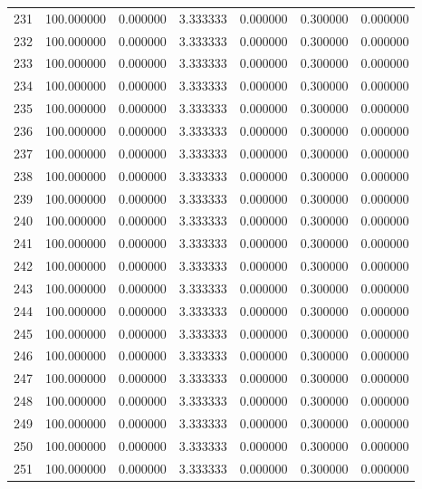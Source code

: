 \begin{tabular}{rrrrrrr}
231 & 100.000000 &    0.000000 &  3.333333 &    0.000000 &    0.300000 &  0.000000 \\
232 & 100.000000 &    0.000000 &  3.333333 &    0.000000 &    0.300000 &  0.000000 \\
233 & 100.000000 &    0.000000 &  3.333333 &    0.000000 &    0.300000 &  0.000000 \\
234 & 100.000000 &    0.000000 &  3.333333 &    0.000000 &    0.300000 &  0.000000 \\
235 & 100.000000 &    0.000000 &  3.333333 &    0.000000 &    0.300000 &  0.000000 \\
236 & 100.000000 &    0.000000 &  3.333333 &    0.000000 &    0.300000 &  0.000000 \\
237 & 100.000000 &    0.000000 &  3.333333 &    0.000000 &    0.300000 &  0.000000 \\
238 & 100.000000 &    0.000000 &  3.333333 &    0.000000 &    0.300000 &  0.000000 \\
239 & 100.000000 &    0.000000 &  3.333333 &    0.000000 &    0.300000 &  0.000000 \\
240 & 100.000000 &    0.000000 &  3.333333 &    0.000000 &    0.300000 &  0.000000 \\
241 & 100.000000 &    0.000000 &  3.333333 &    0.000000 &    0.300000 &  0.000000 \\
242 & 100.000000 &    0.000000 &  3.333333 &    0.000000 &    0.300000 &  0.000000 \\
243 & 100.000000 &    0.000000 &  3.333333 &    0.000000 &    0.300000 &  0.000000 \\
244 & 100.000000 &    0.000000 &  3.333333 &    0.000000 &    0.300000 &  0.000000 \\
245 & 100.000000 &    0.000000 &  3.333333 &    0.000000 &    0.300000 &  0.000000 \\
246 & 100.000000 &    0.000000 &  3.333333 &    0.000000 &    0.300000 &  0.000000 \\
247 & 100.000000 &    0.000000 &  3.333333 &    0.000000 &    0.300000 &  0.000000 \\
248 & 100.000000 &    0.000000 &  3.333333 &    0.000000 &    0.300000 &  0.000000 \\
249 & 100.000000 &    0.000000 &  3.333333 &    0.000000 &    0.300000 &  0.000000 \\
250 & 100.000000 &    0.000000 &  3.333333 &    0.000000 &    0.300000 &  0.000000 \\
251 & 100.000000 &    0.000000 &  3.333333 &    0.000000 &    0.300000 &  0.000000 \\

\end{tabular}
